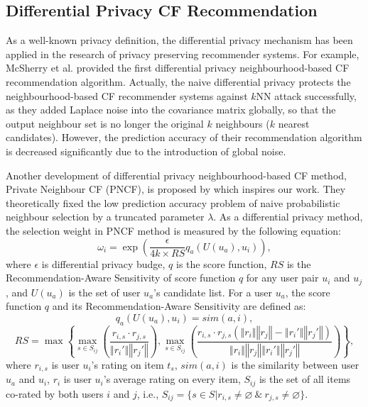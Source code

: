 \documentclass[11pt]{article}
\begin{document}
\subsection{Differential Privacy CF Recommendation}
As a well-known privacy definition, the differential privacy mechanism \cite{DWORK2006} has been applied in the research of privacy preserving recommender systems. For example, McSherry et al. \cite{MCSHERRY2009} provided the first differential privacy neighbourhood-based CF recommendation algorithm. Actually, the naive differential privacy protects the neighbourhood-based CF recommender systems against $k$NN attack successfully, as they added Laplace noise into the covariance matrix globally, so that the output neighbour set is no longer the original $k$ neighbours ($k$ nearest candidates). However, the prediction accuracy of their recommendation algorithm is decreased significantly due to the introduction of global noise.

Another development of differential privacy neighbourhood-based CF method, Private Neighbour CF (PNCF), is proposed by \cite{ZHU2014} which inspires our work. They theoretically fixed the low prediction accuracy problem of naive probabilistic neighbour selection \cite{ADAMOPOULOS2014} by a truncated parameter $\lambda$. As a differential privacy method, the selection weight in PNCF method is measured by the following equation:
\begin{equation}
\label{OMEGA}
\omega_i=\exp(\frac{\epsilon}{4k\times RS}q_a(U(u_a),u_i)),
\end{equation}
where $\epsilon$ is differential privacy budge, $q$ is the score function, $RS$ is the Recommendation-Aware Sensitivity of score function $q$ for any user pair $u_i$ and $u_j$, and $U(u_a)$ is the set of user $u_a$'s candidate list. For a user $u_a$, the score function $q$ and its Recommendation-Aware Sensitivity are defined as:
\begin{equation}
\label{SelectionFunc}
q_a(U(u_a),u_i)=sim(a,i),
\end{equation}
\begin{equation}
\label{RS}
RS=\max\left\{ \underset{s\in S_{ij}}{\max}\left(\frac{r_{i,s}\cdot r_{j,s}}{\left\Vert r_{i}'\right\Vert \left\Vert r_{j}'\right\Vert }\right),\underset{s\in S_{ij}}{\max}\left(\frac{r_{i,s}\cdot r_{j,s}\left(\left\Vert r_{i}\right\Vert \left\Vert r_{j}\right\Vert -\left\Vert r_{i}'\right\Vert \left\Vert r_{j}'\right\Vert \right)}{\left\Vert r_{i}\right\Vert \left\Vert r_{j}\right\Vert \left\Vert r_{i}'\right\Vert \left\Vert r_{j}'\right\Vert }\right)\right\},
\end{equation}
where $r_{i,s}$ is user $u_i$'s rating on item $t_s$, $sim(a,i)$ is the similarity between user $u_a$ and $u_i$, $r_i$ is user $u_i$'s average rating on every item, $S_{ij}$ is the set of all items co-rated by both users $i$ and
$j$, i.e., $S_{ij}=\{s\in S|r_{i,s}\neq \varnothing \ \&\
r_{j,s}\neq \varnothing \}$.
\end{document}
